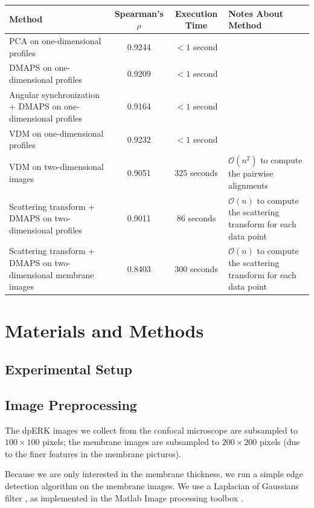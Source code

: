 \documentclass[10pt]{article}
\begin{document}
\begin{table}
	\begin{tabular}{| p{} | c | c | p{} |}
		\hline 
		Method & Spearman's $\rho$ & Execution Time & Notes About Method \\ 
		\hline 
		PCA on one-dimensional profiles & 0.9244 & $< 1$ second & \\
		\hline 
		DMAPS on one-dimensional profiles & 0.9209 & $< 1$ second & \\
		\hline 
		Angular synchronization + DMAPS on one-dimensional profiles & 0.9164 & $< 1$ second & \\
		\hline 
		VDM on one-dimensional profiles & 0.9232 & $< 1$ second & \\	
		\hline 
		VDM on two-dimensional images & 0.9051  & $325$ seconds & $\mathcal{O}(n^2)$ to compute the pairwise alignments\\
		\hline 	
		Scattering transform + DMAPS on two-dimensional profiles & 0.9011  & $86$ seconds &  $\mathcal{O}(n)$ to compute the scattering transform for each data point \\
		\hline
		Scattering transform + DMAPS on two-dimensional membrane images & 0.8403  & $300$ seconds &  $\mathcal{O}(n)$ to compute the scattering transform for each data point \\
		\hline
	\end{tabular}
\end{table}
\section*{Materials and Methods}

\subsection*{Experimental Setup}

\subsection*{Image Preprocessing}
The dpERK images we collect from the confocal microscope are subsampled to $100 \times 100$ pixels; the membrane images are subsampled to $200 \times 200$ pixels (due to the finer features in the membrane pictures). 

Because we are only interested in the membrane thickness, we run a simple edge detection algorithm on the membrane images.
%
We use a Laplacian of Gaussians filter \cite{...}, as implemented in the Matlab Image processing toolbox \cite{...}.
\end{document}
